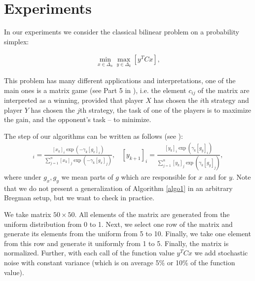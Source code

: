 \documentclass[runningheads]{llncs}
\begin{document}
\section{Experiments}

In our experiments we consider the classical bilinear problem on a probability simplex:

\begin{eqnarray}
\label{exp_pr_4}
\min_{x\in \Delta_n}\max_{y\in \Delta_k} \left[  y^T Cx\right],
\end{eqnarray}

This problem has many different applications and interpretations, one of the main ones is a matrix game (see Part 5 in \cite{nemirovski}), i.e. the element $c_{ij}$ of the matrix are interpreted as a winning, provided that player $X$ has chosen the $i$th strategy and player $Y$ has chosen the $j$th strategy, the task of one of the players is to maximize the gain, and the opponent’s task -- to minimize.

The step of our algorithms can be written as follows (see \cite{aleks2020gradientfree}):
\begin{eqnarray*}
[x_{k+1}]_i = \frac{[x_k]_i \exp(-\gamma_k [g_x]_i)}{\sum\limits_{j=1}^n [x_k]_j \exp(-\gamma_k [g_x]_j)}, ~~~~
[y_{k+1}]_i = \frac{[y_k]_i \exp(\gamma_k [g_y]_i)}{\sum\limits_{j=1}^n [y_k]_j \exp(\gamma_k [g_y]_j)},
\end{eqnarray*}
where under $g_x, g_y$ we mean parts of $g$ which are responsible for $x$ and for $y$. Note that we do not present a generalization of Algorithm \ref{algo1} in an arbitrary Bregman setup, but we want to check in practice. 

We take matrix $50 \times 50$. All elements of the matrix are generated from the uniform distribution from 0 to 1. Next, we select one row of the matrix and generate its elements from the uniform from 5 to 10. Finally, we take one element from this row and generate it uniformly from 1 to 5. Finally, the matrix is normalized. Further, with each call of the function value $y^T Cx$ we add stochastic noise with constant variance (which is on average 5\% or 10\% of the function value). 
\end{document}
